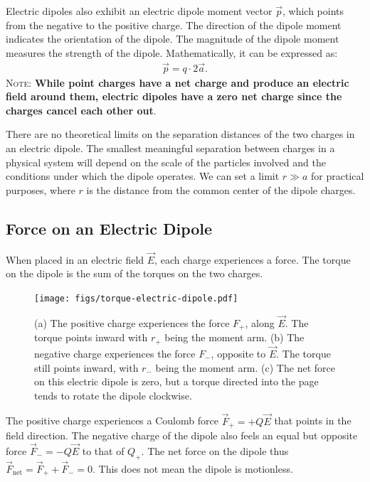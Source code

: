 \documentclass[12pt,b4paper]{article}
\begin{document}
Electric dipoles also exhibit an electric dipole moment vector $\Vec{p}$, which points from the negative to the positive charge. The direction of the dipole moment indicates the orientation of the dipole. The magnitude of the dipole moment measures the strength of the dipole. Mathematically, it can be expressed as:
\begin{align}
    \vec{p}=q\cdot2\vec{a}.
\end{align}
\textsc{Note}: \textbf{While point charges have a net charge and produce an electric field around them, electric dipoles have a zero net charge since the charges cancel each other out}.

There are no theoretical limits on the separation distances of the two charges in an electric dipole. The smallest meaningful separation between charges in a physical system will depend on the scale of the particles involved and the conditions under which the dipole operates. We can set a limit $r\gg a$ for practical purposes, where $r$ is the distance from the common center of the dipole charges.
\subsection{Force on an Electric Dipole}
When placed in an electric field $\vec{E}$, each charge experiences a force. The torque on the dipole is the sum of the torques on the two charges.
\begin{figure}[H]
    \centering
    \texttt{[image: figs/torque-electric-dipole.pdf]}
    \caption{(a) The positive charge experiences the force $F_+$, along $\vec{E}$. The torque points inward with $r_+$ being the moment arm. (b) The negative charge experiences the force $F_-$, opposite to $\vec{E}$. The torque still points inward, with $r_-$ being the moment arm. (c) The net force on this electric dipole is zero, but a torque directed into the page tends to rotate the dipole clockwise.}
    \label{fig:torque-electric-dipole}
\end{figure}
The positive charge experiences a Coulomb force $\vec{F}_+=+Q\vec{E}$ that points in the field direction. The negative charge of the dipole also feels an equal but opposite force $\vec{F}_-=-Q\vec{E}$ to that of $Q_+$. The net force on the dipole thus $\vec{F}_\text{net}=\vec{F}_++\vec{F}_-=0$. This does not mean the dipole is motionless. 
\end{document}
